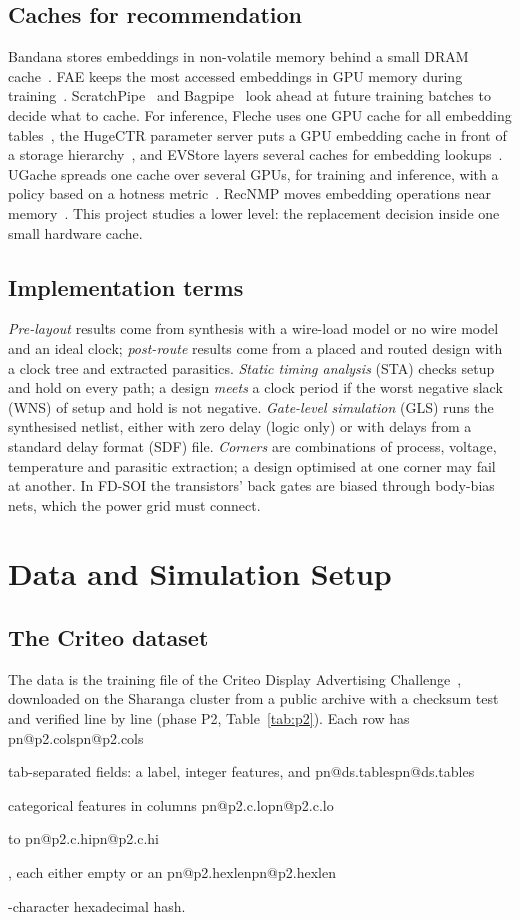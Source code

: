 \documentclass[11pt,a4paper]{report}
\makeatletter
\DeclareRobustCommand{\R}[1]{\ifcsname pn@#1\endcsname\csname pn@#1\endcsname\else
  \PackageError{report}{number key '#1' is not defined in macros.tex}{Run tools/make_paper_macros.py --target report}\fi}
\makeatother
\begin{document}
\section{Caches for recommendation}
Bandana stores embeddings in non-volatile memory behind a small DRAM cache~\cite{eisenman2019bandana}. FAE keeps the
most accessed embeddings in GPU memory during training~\cite{adnan2022fae}. ScratchPipe~\cite{kwon2022scratchpipe}
and Bagpipe~\cite{agarwal2023bagpipe} look ahead at future training batches to decide what to cache. For inference,
Fleche uses one GPU cache for all embedding tables~\cite{xie2022fleche}, the HugeCTR parameter server puts a GPU
embedding cache in front of a storage hierarchy~\cite{wei2022hps}, and EVStore layers several caches for embedding
lookups~\cite{kurniawan2023evstore}. UGache spreads one cache over several GPUs, for training and inference, with a
policy based on a hotness metric~\cite{song2023ugache}. RecNMP moves embedding operations near
memory~\cite{ke2020recnmp}. This project studies a lower level: the replacement decision inside one small hardware
cache.

\section{Implementation terms}
\emph{Pre-layout} results come from synthesis with a wire-load model or no wire model and an ideal clock;
\emph{post-route} results come from a placed and routed design with a clock tree and extracted parasitics.
\emph{Static timing analysis} (STA) checks setup and hold on every path; a design \emph{meets} a clock period if the
worst negative slack (WNS) of setup and hold is not negative. \emph{Gate-level simulation} (GLS) runs the synthesised
netlist, either with zero delay (logic only) or with delays from a standard delay format (SDF) file. \emph{Corners}
are combinations of process, voltage, temperature and parasitic extraction; a design optimised at one corner may fail
at another. In FD-SOI the transistors' back gates are biased through body-bias nets, which the power grid must
connect.

\chapter{Data and Simulation Setup}\label{ch:data}
\section{The Criteo dataset}
The data is the training file of the Criteo Display Advertising Challenge~\cite{criteo2014dac}, downloaded on the
Sharanga cluster from a public archive with a checksum test and verified line by line (phase P2,
Table~\ref{tab:p2}). Each row has \R{p2.cols} tab-separated fields: a label, integer features, and \R{ds.tables}
categorical features in columns \R{p2.c.lo} to \R{p2.c.hi}, each either empty or an \R{p2.hexlen}-character hexadecimal
hash.
\end{document}

